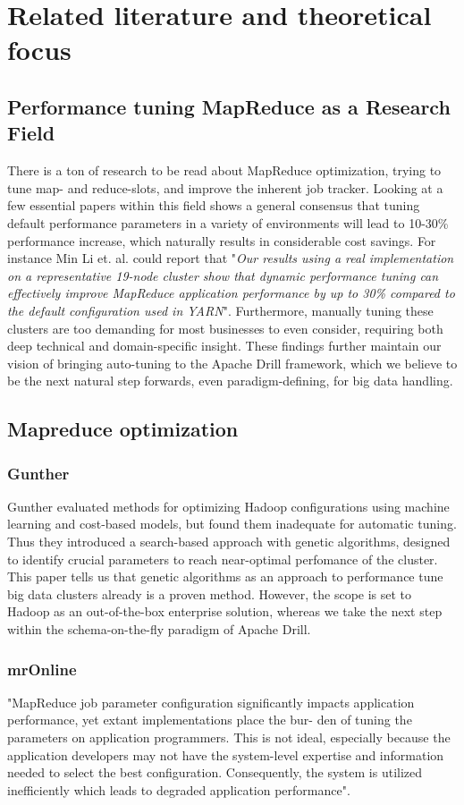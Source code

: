 \documentclass[a4paper,english]{report}
\begin{document}
	\section{Related literature and theoretical focus}
		\subsection{Performance tuning MapReduce as a Research Field}
		There is a ton of research to be read about MapReduce optimization, trying to tune map- and reduce-slots, and improve the inherent job tracker. Looking at a few essential papers within this field shows a general consensus that tuning default performance parameters in a variety of environments will lead to 10-30\% performance increase, which naturally results in considerable cost savings. For instance Min Li et. al. could report that "\textit{Our results using a real implementation on a representative 19-node cluster show that dynamic performance tuning can effectively improve MapReduce application performance by up to 30\% compared to the default configuration used in YARN}"\cite{mronline}. Furthermore, manually tuning these clusters are too demanding for most businesses to even consider, requiring both deep technical and domain-specific insight. These findings further maintain our vision of bringing auto-tuning to the Apache Drill framework, which we believe to be the next natural step forwards, even paradigm-defining, for big data handling.
	
		\subsection{Mapreduce optimization}
			\subsubsection{Gunther}
			Gunther evaluated methods for optimizing Hadoop configurations using machine learning and cost-based models, but found them inadequate for automatic tuning. Thus they introduced a search-based approach with genetic algorithms, designed to identify crucial parameters to reach near-optimal perfomance of the cluster\cite{gunther}. This paper tells us that genetic algorithms as an approach to performance tune big data clusters already is a proven method. However, the scope is set to Hadoop as an out-of-the-box enterprise solution, whereas we take the next step within the schema-on-the-fly paradigm of Apache Drill.
			
			\subsubsection{mrOnline}
			"MapReduce job parameter configuration significantly impacts
			application performance, yet extant implementations place the bur-
			den of tuning the parameters on application programmers. This is
			not ideal, especially because the application developers may not
			have the system-level expertise and information needed to select
			the best configuration. Consequently, the system is utilized inefficiently which leads to degraded application performance"\cite{mronline}.
			
\end{document}
